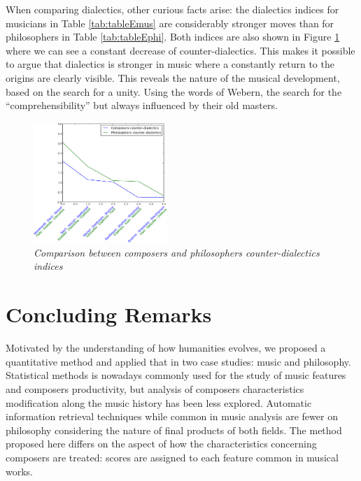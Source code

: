 \documentclass[
 aip,
 jmp,
 amsmath,amssymb,
 reprint,
]{revtex4-1}
\begin{document}
When comparing dialectics, other curious facts arise: the dialectics
indices for musicians in Table \ref{tab:tableEmus} are considerably stronger moves than for
philosophers in Table \ref{tab:tableEphi}. Both indices are also shown in Figure
\ref{fig:comparingdialectics} where we can see a constant decrease
of counter-dialectics. This makes it possible to argue
that dialectics is stronger in music where a
constantly return to the origins are clearly visible. This reveals the nature of the
musical development, based on the search for a unity. Using the words
of Webern, the search for the ``comprehensibility'' but always
influenced by their old masters.

\begin{figure}[ht]
        \begin{center}
                \includegraphics[width=0.45\textwidth]{compara_dialeticas2}
        \end{center}
        \caption{\it Comparison between composers and philosophers
          counter-dialectics indices}
        \label{fig:comparingdialectics}
\end{figure}

\section{Concluding Remarks}

Motivated by the understanding of how humanities evolves, we proposed a quantitative method and applied that in two case studies: music and philosophy. Statistical
methods is nowadays commonly used for the study of music features and
composers productivity, but analysis of
composers characteristics modification along the music history has been less
explored. Automatic information retrieval techniques while common in music analysis are fewer on philosophy considering the nature of final products of both fields. The method proposed here differs on the
aspect of how the characteristics concerning composers are treated:
scores are assigned to each feature common in musical
works. 
\end{document}
